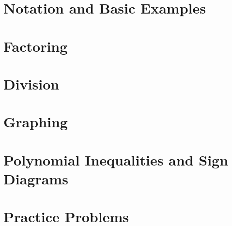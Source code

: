 \section{Notation and Basic Examples}

\newpage

\section{Factoring}

\newpage


\newpage

\section{Division}

\newpage


\newpage

\section{Graphing}

\newpage


\newpage

\section{Polynomial Inequalities and Sign Diagrams}

\newpage

\section{Practice Problems}

\newpage
\closegraphsfile